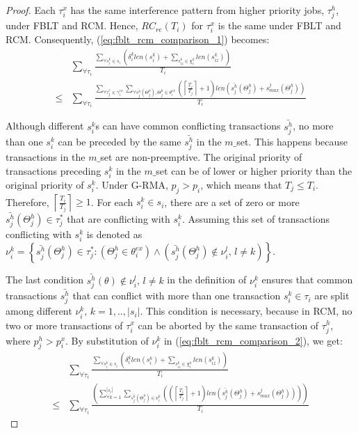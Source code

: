 \documentclass[prodmode,acmtecs]{acmsmall}
\begin{document}
\begin{compactenum}
\begin{proof}
Each $\tau_i^x$ has the same interference pattern from higher priority jobs, $\tau_j^h$, under FBLT and RCM. Hence, $RC_{re}(T_i)$ for $\tau_i^x$ is the same under FBLT and RCM. Consequently, (\ref{eq:fblt_rcm_comparison_1}) becomes:
\begin{eqnarray}
 & \sum_{\forall\tau_{i}}\frac{\sum_{\forall s_{i}^{k}\in s_{i}}\left(\delta_i^klen(s_{i}^{k})+\sum_{s_{iz}^k\in \chi_i^k} len(s_{iz}^{k})\right)}{T_{i}}\label{eq:fblt_rcm_comparison_2}\\
\le & \sum_{\forall\tau_{i}}\frac{\sum_{\forall\tau_{j}^{*}\in\gamma_{i}^{ex}}\sum_{\forall \bar{s_j^h}(\Theta_j^h),\Theta_j^h \in\theta_{i}^{ex}}\left(\left\lceil \frac{T_{i}}{T_{j}}\right\rceil +1\right)len\left(\bar{s_{j}^{h}}(\Theta_j^h)+s_{max}^{j}(\Theta_j^h)\right)}{T_{i}}\nonumber 
\end{eqnarray}


Although different $s_{i}^{k}$s can have common conflicting transactions
$\bar{s_{j}^{h}}$, no more than one $s_{i}^{k}$ can be preceded
by the same $\bar{s_{j}^{h}}$ in the $m\_$set. This happens because
transactions in the $m\_$set are non-preemptive. 
%
The original priority of transactions preceding $s_{i}^{k}$ in the $m\_$set can be of
lower or higher priority than the original priority of $s_{i}^{k}$. Under
G-RMA, $p_{j}>p_{i}$, which means that $T_{j}\le T_{i}$. Therefore, $\left\lceil \frac{T_{i}}{T_{j}}\right\rceil \ge1$.
For each $s_{i}^{k}\in s_{i}$, there are a set of zero or more $\bar{s_{j}^{h}}(\Theta_j^h)\in\tau_{j}^{*}$
that are conflicting with $s_{i}^{k}$. Assuming this set of 
transactions conflicting with $s_{i}^{k}$ is denoted as $\nu_{i}^{k}=\left\{ \bar{s_{j}^{h}}(\Theta_j^h)\in\tau_{j}^{*}:\left(\Theta_j^h\in\theta_{i}^{ex}\right)\wedge\left(\bar{s_{j}^{h}}(\Theta_j^h)\not\in\nu_{i}^{l},\, l\ne k\right)\right\} $.


The last condition $\bar{s_{j}^{h}}(\theta)\not\in\nu_{i}^{l},\, l\ne k$
in the definition of $\nu_{i}^{k}$ ensures that common transactions $\bar{s_{j}^{h}}$
that can conflict with more than one transaction $s_{i}^{k}\in\tau_{i}$
are split among different $\nu_{i}^{k},\, k=1,..,|s_{i}|$. This
condition is necessary, because in RCM, no two or more transactions
of $\tau_{i}^{x}$ can be aborted by the same transaction of $\tau_{j}^{h}$, 
where $p_{j}^{h}>p_{i}^{x}$. By substitution of $\nu_{i}^{k}$ in
(\ref{eq:fblt_rcm_comparison_2}), we get: 
\begin{eqnarray}
 & \sum_{\forall\tau_{i}}\frac{\sum_{\forall s_{i}^{k}\in s_{i}}\left(\delta_i^klen(s_{i}^{k})+\sum_{s_{iz}^k\in \chi_i^k} len(s_{iz}^{k})\right)}{T_{i}}\label{eq:fblt_rcm_comparison_4}\\
\le & \sum_{\forall\tau_{i}}\frac{\left(\sum_{\forall k=1}^{|s_{i}|}\sum_{\bar{s_{j}^{h}}(\Theta_j^h)\in\nu_{i}^{k}}\left(\left(\left\lceil \frac{T_{i}}{T_{j}}\right\rceil +1\right)len\left(\bar{s_{j}^{h}}(\Theta_j^h)+s_{max}^{j}(\Theta_j^h)\right)\right)\right)}{T_{i}}\nonumber 
\end{eqnarray}



\end{proof}
\end{compactenum}
\end{document}
